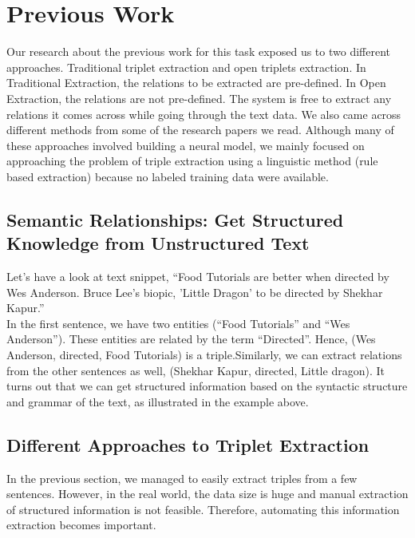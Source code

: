 \documentclass[11pt,letterpaper]{article}
\begin{document}
\section{Previous Work}
Our research about the previous work for this task exposed us to two different approaches. Traditional triplet extraction and open triplets extraction. In Traditional Extraction, the relations to be extracted are pre-defined. In Open Extraction, the relations are not pre-defined. The system is free to extract any relations it comes across while going through the text data. We also came across different methods from some of the research papers we read. Although many of these approaches involved building a neural model, we mainly focused on approaching the problem of triple extraction using a linguistic method (rule based extraction) because no labeled training data were available.

\subsection{Semantic Relationships: Get Structured Knowledge from Unstructured Text}
Let's have a look at text snippet, “Food Tutorials are better when directed by Wes Anderson. Bruce Lee's biopic, 'Little Dragon' to be directed by Shekhar Kapur.” \\

In the first sentence, we have two entities (“Food Tutorials” and “Wes Anderson”). These entities are related by the term “Directed”. Hence, (Wes Anderson, directed, Food Tutorials) is a triple.Similarly, we can extract relations from the other sentences as well, (Shekhar Kapur, directed, Little dragon). It turns out that we can get structured information based on the syntactic structure and grammar of the text, as illustrated in the example above.

\subsection{Different Approaches to Triplet Extraction}
In the previous section, we managed to easily extract triples from a few sentences. However, in the real world, the data size is huge and manual extraction of structured information is not feasible. Therefore, automating this information extraction becomes important.\\
\end{document}
